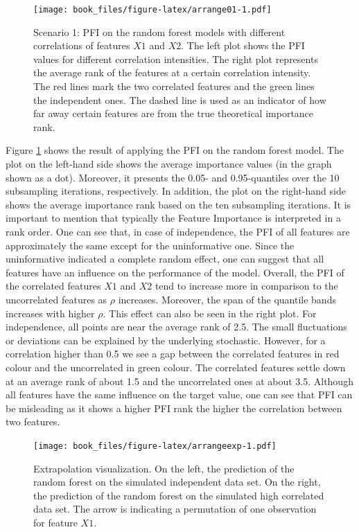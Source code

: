 \documentclass[]{krantz}
\begin{document}
\begin{figure}
\centering
\texttt{[image: book\_files/figure-latex/arrange01-1.pdf]}
\caption{\label{fig:arrange01}Scenario 1: PFI on the random forest models
with different correlations of features \(X1\) and \(X2\). The left plot
shows the PFI values for different correlation intensities. The right
plot represents the average rank of the features at a certain
correlation intensity. The red lines mark the two correlated features
and the green lines the independent ones. The dashed line is used as an
indicator of how far away certain features are from the true theoretical
importance rank.}
\end{figure}

Figure \ref{fig:arrange01} shows the result of applying the PFI on the
random forest model. The plot on the left-hand side shows the average
importance values (in the graph shown as a dot). Moreover, it presents
the 0.05- and 0.95-quantiles over the 10 subsampling iterations,
respectively. In addition, the plot on the right-hand side shows the
average importance rank based on the ten subsampling iterations. It is
important to mention that typically the Feature Importance is
interpreted in a rank order. One can see that, in case of independence,
the PFI of all features are approximately the same except for the
uninformative one. Since the uninformative indicated a complete random
effect, one can suggest that all features have an influence on the
performance of the model. Overall, the PFI of the correlated features
\(X1\) and \(X2\) tend to increase more in comparison to the
uncorrelated features as \(\rho\) increases. Moreover, the span of the
quantile bands increases with higher \(\rho\). This effect can also be
seen in the right plot. For independence, all points are near the
average rank of 2.5. The small fluctuations or deviations can be
explained by the underlying stochastic. However, for a correlation
higher than 0.5 we see a gap between the correlated features in red
colour and the uncorrelated in green colour. The correlated features
settle down at an average rank of about 1.5 and the uncorrelated ones at
about 3.5. Although all features have the same influence on the target
value, one can see that PFI can be misleading as it shows a higher PFI
rank the higher the correlation between two features.

\begin{figure}
\centering
\texttt{[image: book\_files/figure-latex/arrangeexp-1.pdf]}
\caption{\label{fig:arrangeexp}Extrapolation visualization. On the left, the
prediction of the random forest on the simulated independent data set.
On the right, the prediction of the random forest on the simulated high
correlated data set. The arrow is indicating a permutation of one
observation for feature \(X1\).}
\end{figure}
\end{document}
